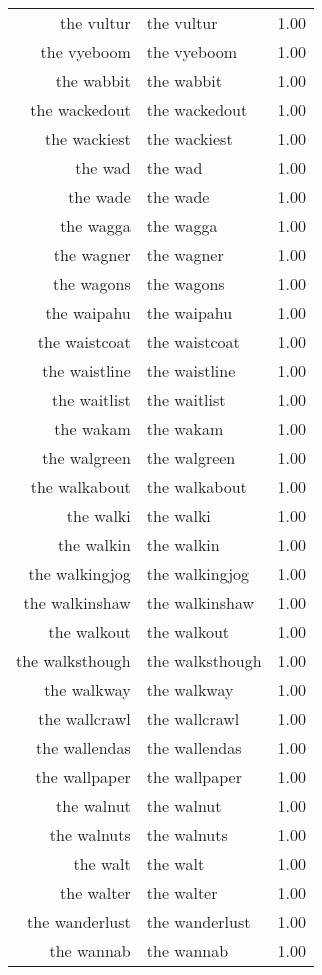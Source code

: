 \begin{table}[ht]
\begin{tabular}{rlr}
  the vultur & the vultur & 1.00 \\ 
  the vyeboom & the vyeboom & 1.00 \\ 
  the wabbit & the wabbit & 1.00 \\ 
  the wackedout & the wackedout & 1.00 \\ 
  the wackiest & the wackiest & 1.00 \\ 
  the wad & the wad & 1.00 \\ 
  the wade & the wade & 1.00 \\ 
  the wagga & the wagga & 1.00 \\ 
  the wagner & the wagner & 1.00 \\ 
  the wagons & the wagons & 1.00 \\ 
  the waipahu & the waipahu & 1.00 \\ 
  the waistcoat & the waistcoat & 1.00 \\ 
  the waistline & the waistline & 1.00 \\ 
  the waitlist & the waitlist & 1.00 \\ 
  the wakam & the wakam & 1.00 \\ 
  the walgreen & the walgreen & 1.00 \\ 
  the walkabout & the walkabout & 1.00 \\ 
  the walki & the walki & 1.00 \\ 
  the walkin & the walkin & 1.00 \\ 
  the walkingjog & the walkingjog & 1.00 \\ 
  the walkinshaw & the walkinshaw & 1.00 \\ 
  the walkout & the walkout & 1.00 \\ 
  the walksthough & the walksthough & 1.00 \\ 
  the walkway & the walkway & 1.00 \\ 
  the wallcrawl & the wallcrawl & 1.00 \\ 
  the wallendas & the wallendas & 1.00 \\ 
  the wallpaper & the wallpaper & 1.00 \\ 
  the walnut & the walnut & 1.00 \\ 
  the walnuts & the walnuts & 1.00 \\ 
  the walt & the walt & 1.00 \\ 
  the walter & the walter & 1.00 \\ 
  the wanderlust & the wanderlust & 1.00 \\ 
  the wannab & the wannab & 1.00 \\ 

\end{tabular}
\end{table}

